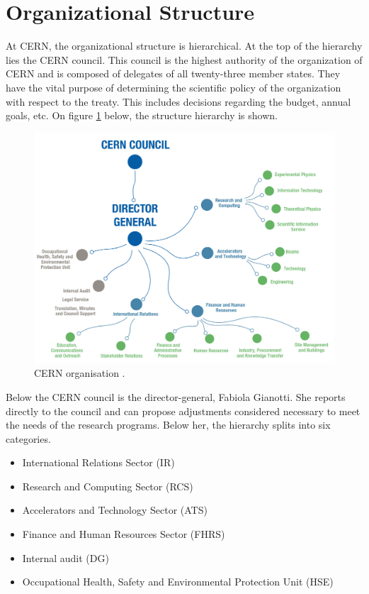\section{Organizational Structure}

At CERN, the organizational structure is hierarchical. At the top of the hierarchy lies the CERN council. This council is the highest authority of the organization of CERN and is composed of delegates of all twenty-three member states. They have the vital purpose of determining the scientific policy of the organization with respect to the treaty. This includes decisions regarding the budget, annual goals, etc. On figure \ref{fig:pic193} below, the structure hierarchy is shown.
\begin{figure}[H]
    \centering
    \includegraphics[width=1\textwidth]{AAUgraphics/AboutCERN_Organigramme.jpg}
    \caption{CERN organisation \cite{Environm54:online}.}
    \label{fig:pic193}
\end{figure}

\noindent Below the CERN council is the director-general, Fabiola Gianotti. She reports directly to the council and can propose adjustments considered necessary to meet the needs of the research programs. Below her, the hierarchy splits into six categories. 

\begin{itemize}
    \item International Relations Sector (IR)
    \item Research and Computing Sector (RCS)
    \item Accelerators and Technology Sector (ATS)
    \item Finance and Human Resources Sector (FHRS)
    \item Internal audit (DG)
    \item Occupational Health, Safety and Environmental Protection Unit (HSE)
\end{itemize}

